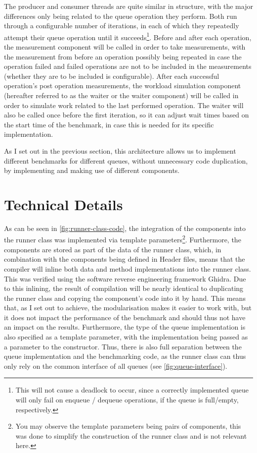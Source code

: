 The producer and consumer threads are quite similar in structure, with the major differences only being
related to the queue operation they perform.
Both run through a configurable number of iterations, in each of which they repeatedly attempt their queue operation
until it succeeds\footnote{This will not cause a deadlock to occur, since a correctly implemented queue will
only fail on enqueue / dequeue operations, if the queue is full/empty, respectively.}.
Before and after each operation, the measurement component will be called in order to take measurements, with
the measurement from before an operation possibly being repeated in case the operation failed and failed
operations are not to be included in the measurements (whether they are to be included is configurable).
After each successful operation's post operation measurements, the workload simulation component (hereafter
referred to as the waiter or the waiter component) will be called in order to simulate work related
to the last performed operation.
The waiter will also be called once before the first iteration, so it can adjust wait times based on the
start time of the benchmark, in case this is needed for its specific implementation.

As I set out in the previous section, this architecture allows us to implement different benchmarks for
different queues, without unnecessary code duplication, by implementing and making use of different components.

\section{Technical Details}
\label{sec:framework-technical-details}



As can be seen in \autoref{fig:runner-class-code}, the integration of the components into the runner class
was implemented via template parameters\footnote{You may observe the template parameters being pairs of
components, this was done to simplify the construction of the runner class and is not relevant here.}.
Furthermore, the components are stored as part of the data of the runner class, which, in combination with the
components being defined in Header files, means that the compiler will inline both data and method
implementations into the runner class.
This was verified using the software reverse engineering framework Ghidra.
Due to this inlining, the result of compilation will be nearly identical to duplicating the runner class and
copying the component's code into it by hand.
This means that, as I set out to achieve, the modularisation makes it easier to work with, but it does not
impact the performance of the benchmark and should thus not have an impact on the results.
Furthermore, the type of the queue implementation is also specified as a template parameter, with the
implementation being passed as a parameter to the constructor.
Thus, there is also full separation between the queue implementation and the benchmarking code, as the runner
class can thus only rely on the common interface of all queues (see \autoref{fig:queue-interface}).

